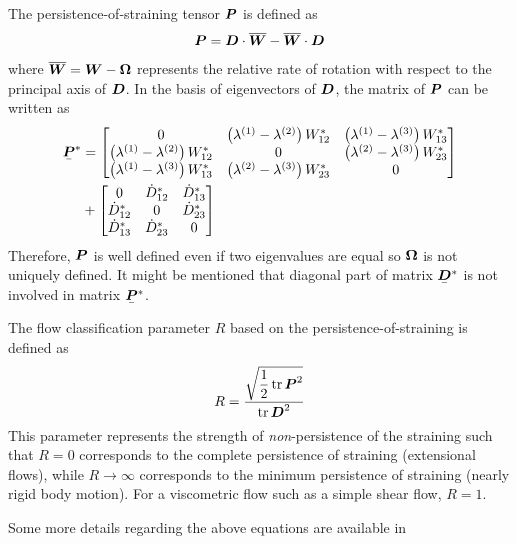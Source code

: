 The persistence-of-straining tensor $\boldsymbol{P}$ is defined as
\begin{equation}
\boldsymbol{P} =
\boldsymbol{D} \cdot \boldsymbol{\overline{W}} 
-
\boldsymbol{\overline{W}} \cdot \boldsymbol{D}  
\end{equation}
where
$\boldsymbol{\overline{W}} = \boldsymbol{W} - \boldsymbol{\Omega}$ represents
the relative rate of rotation with respect to the principal axis
of $\boldsymbol{D}$.
%
In the basis of eigenvectors of $\boldsymbol{D}$,
the matrix of $\boldsymbol{P}$
can be written as
\begin{equation}
\begin{split}
\mat{\ten{P}}^{*} 
& =
\left[
\begin{matrix}
0 & 
\left(\lambda^{(1)}-\lambda^{(2)}\right) W_{12}^* & 
\left(\lambda^{(1)}-\lambda^{(3)}\right) W_{13}^* \\
\left(\lambda^{(1)}-\lambda^{(2)}\right) W_{12}^* & 
0 &
\left(\lambda^{(2)}-\lambda^{(3)}\right) W_{23}^* \\
\left(\lambda^{(1)}-\lambda^{(3)}\right) W_{13}^* & 
\left(\lambda^{(2)}-\lambda^{(3)}\right) W_{23}^* &
0
\end{matrix}
\right]
\\
& +
\left[
\begin{matrix}
0 & 
\dot{D}_{12}^* & 
\dot{D}_{13}^* \\
\dot{D}_{12}^* & 
0 &
\dot{D}_{23}^* \\
\dot{D}_{13}^* & 
\dot{D}_{23}^* &
0
\end{matrix}
\right]
\end{split}
\end{equation}
Therefore,
$\boldsymbol{P}$ is well defined even if two eigenvalues are equal so $\boldsymbol{\Omega}$
is not uniquely defined.
It might be mentioned that diagonal part of matrix $\mat{\ten{D}}^*$ is not involved in 
matrix $\mat{\ten{P}}^*$.

The flow classification parameter $R$ based on 
the persistence-of-straining is defined as
\begin{equation}
R = \dfrac{\sqrt{\dfrac{1}{2} \operatorname{tr} {\boldsymbol{P}^2}} }{\operatorname{tr} {\boldsymbol{D}^2}}
\end{equation}
This parameter represents the strength of \emph{non}-persistence of the straining such that
$R = 0$ corresponds to the complete persistence of straining (extensional flows), 
while $R \to \infty $ corresponds to the minimum persistence of straining (nearly rigid body motion).
For a viscometric flow such as a simple shear flow, $R = 1$.

Some more details regarding the above equations are available in \cite{Park2020}

